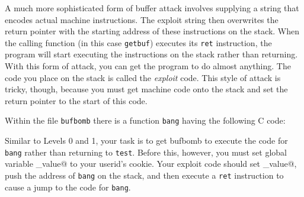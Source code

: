 \documentclass[11pt]{article}
\newenvironment{ccode}%
{\small}%
{}
\begin{document}
A much more sophisticated form of buffer attack involves supplying a
string that encodes actual machine instructions.  The exploit string
then overwrites the return pointer with the starting address of these
instructions on the stack.  When the calling function (in this case
{\tt getbuf}) executes its {\tt ret} instruction, the program will
start executing the instructions on the stack rather than returning.
With this form of attack, you can get the program to do almost
anything.  The code you place on the stack is called the {\em exploit}
code.  This style of attack is tricky, though, because you must get
machine code onto the stack and set the return pointer to the start of
this code.

Within the file {\tt bufbomb} there is a function {\tt bang}
having the following C code:

\begin{ccode}

\end{ccode}

Similar to Levels 0 and 1, your task is to get {\sc bufbomb} to
execute the code for {\tt bang} rather than returning to {\tt test}.
Before this, however, you must set global variable \verb@global_value@
to your userid's cookie.  Your exploit code should set
\verb@global_value@, push the address of \texttt{bang} on the stack,
and then execute a \texttt{ret} instruction to cause a jump to the
code for \texttt{bang}. 
\end{document}
